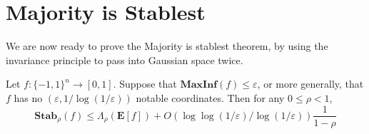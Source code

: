 \section{Majority is Stablest}

We are now ready to prove the Majority is stablest theorem, by using the invariance principle to pass into Gaussian space twice.

\begin{theorem}
    Let $f: \{ -1, 1 \}^n \to [0,1]$. Suppose that $\mathbf{MaxInf}(f) \leq \varepsilon$, or more generally, that $f$ has no $(\varepsilon, 1/\log(1/\varepsilon))$ notable coordinates. Then for any $0 \leq \rho < 1$,
    \[ \mathbf{Stab}_\rho(f) \leq \Lambda_\rho(\mathbf{E}[f]) + O(\log \log(1/\varepsilon)/\log(1/\varepsilon)) \frac{1}{1 - \rho} \]
\end{theorem}
